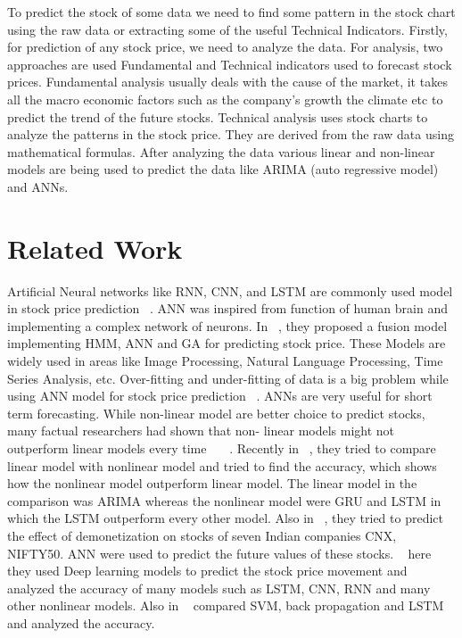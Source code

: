 \documentclass[5p,,preprint,12pt,twocolumn]{elsarticle}
\begin{document}
To predict the stock of some data we need to find some pattern in the stock chart using the raw data or extracting some of the useful Technical Indicators. Firstly, for prediction of any stock price, we need to analyze the data. For analysis, two approaches are used Fundamental and Technical indicators used to forecast stock prices. Fundamental analysis usually deals with the cause of the market, it takes all the macro economic factors such as the company's growth the climate etc to predict the trend of the future stocks. Technical analysis uses stock charts to analyze the patterns in the stock price. They are derived from the raw data using mathematical formulas. After analyzing the data various linear and non-linear models are being used to predict the data like ARIMA (auto regressive model) and ANNs. 
    
\section{Related Work}
Artificial Neural networks like RNN, CNN, and LSTM are commonly used model in stock price prediction \unskip~\cite{490201:11043807}. ANN was inspired from function of human brain and implementing a complex network of neurons.  In \unskip~\cite{490201:11043808}, they proposed a fusion model implementing HMM, ANN and GA for predicting stock price. These Models are widely used in areas like Image Processing, Natural Language Processing, Time Series Analysis, etc. Over-fitting and under-fitting of data is a big problem while using ANN model for stock price prediction \unskip~\cite{490201:11043809}. ANNs are very useful for short term forecasting. While non-linear model are better choice to predict stocks, many factual researchers had shown that non- linear models might not outperform linear models every time \unskip~\cite{490201:11043810}\unskip~\cite{490201:11043811}\unskip~\cite{490201:11043812}. Recently in \unskip~\cite{490201:11043813}, they tried to compare linear model with nonlinear model and tried to find the accuracy, which shows how the nonlinear model outperform linear model. The linear model in the comparison was ARIMA whereas the nonlinear model were GRU and LSTM in which the LSTM outperform every other model. Also in \unskip~\cite{490201:11043814}, they tried to predict the effect of demonetization on stocks of seven Indian companies CNX, NIFTY50. ANN were used to predict the future values of these stocks. \unskip~\cite{490201:11043815} here they used Deep learning models to predict the stock price movement and analyzed the accuracy of many models such as LSTM, CNN, RNN and many other nonlinear models. Also in \unskip~\cite{490201:11043816} compared SVM, back propagation and LSTM and analyzed the accuracy.
    
\end{document}
